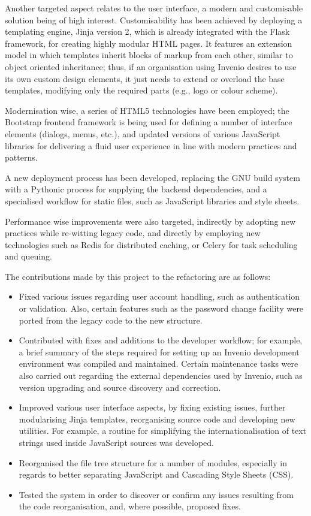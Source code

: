 Another targeted aspect relates to the user interface, a modern and
customisable solution being of high interest. Customisability has been achieved
by deploying a templating engine, Jinja version 2, which is already integrated
with the Flask framework, for creating highly modular HTML pages. It features
an extension model in which templates inherit blocks of markup from each other,
similar to object oriented inheritance; thus, if an organisation using Invenio
desires to use its own custom design elements, it just needs to extend or
overload the base templates, modifying only the required parts (e.g., logo or
colour scheme).

Modernisation wise, a series of HTML5 technologies have been employed; the
Bootstrap \cite{ref:bootstrap} frontend framework is being used for defining a
number of interface elements (dialogs, menus, etc.), and updated versions of
various JavaScript libraries for delivering a fluid user experience in line
with modern practices and patterns.

A new deployment process has been developed, replacing the GNU build system
with a Pythonic process for supplying the backend dependencies, and a
specialised workflow for static files, such as JavaScript libraries and style
sheets.

Performance wise improvements were also targeted, indirectly by adopting new
practices while re-witting legacy code, and directly by employing new
technologies such as Redis \cite{ref:redis} for distributed caching, or Celery
\cite{ref:celery} for task scheduling and queuing.

The contributions made by this project to the refactoring are as follows:
\begin{itemize}
  \item Fixed various issues regarding user account handling, such as
        authentication or validation. Also, certain features such as the
        password change facility were ported from the legacy code to the new
        structure.
  \item Contributed with fixes and additions to the developer workflow; for
        example, a brief summary of the steps required for setting up an Invenio
        development environment was compiled and maintained. Certain
        maintenance tasks were also carried out regarding the external
        dependencies used by Invenio, such as version upgrading and source
        discovery and correction.
  \item Improved various user interface aspects, by fixing existing issues,
        further modularising Jinja templates, reorganising source code and
        developing new utilities. For example, a routine for simplifying the
        internationalisation of text strings used inside JavaScript sources
        was developed.
  \item Reorganised the file tree structure for a number of modules, especially
        in regards to better separating JavaScript and Cascading Style Sheets
        (CSS).
  \item Tested the system in order to discover or confirm any issues resulting
        from the code reorganisation, and, where possible, proposed fixes.
\end{itemize}

